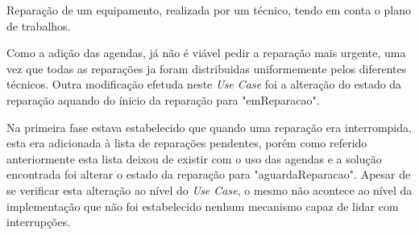 \documentclass[../relatorio.tex]{subfiles}
\begin{document}
Reparação de um equipamento, realizada por um técnico, tendo em conta o plano de trabalhos.

Como a adição das agendas, já não é viável pedir a reparação mais urgente, uma vez que todas as reparações ja foram distribuidas
uniformemente pelos diferentes técnicos.
Outra modificação efetuda neste \textit{Use Case} foi a alteração do estado da reparação aquando do ínicio da reparação para "emReparacao".

Na primeira fase estava estabelecido que quando uma reparação era interrompida, esta era adicionada à lista de reparações pendentes, porém como
referido anteriormente esta lista deixou de existir com o uso das agendas e a solução encontrada foi alterar o estado da reparação para "aguardaReparacao".
Apesar de se verificar esta alteração ao nível do \textit{Use Case}, o mesmo não acontece ao nível da implementação que não foi estabelecido nenhum
mecanismo capaz de lidar com interrupções.
\end{document}
